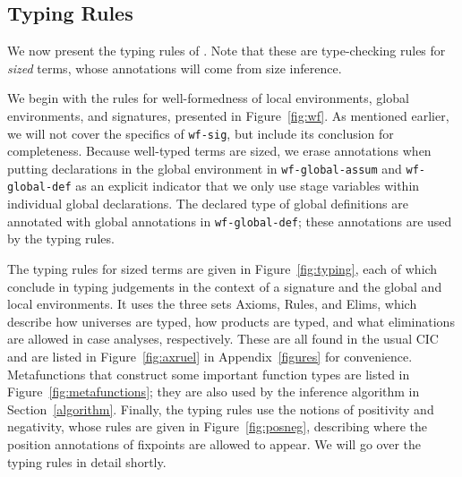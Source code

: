 \documentclass[sigplan,10pt,anonymous,review,nonacm]{acmart}
\begin{document}
\subsection{Typing Rules}





We now present the typing rules of \lang. Note that these are type-checking rules for \textit{sized} terms, whose annotations will come from size inference.

We begin with the rules for well-formedness of local environments, global environments, and signatures, presented in Figure~\ref{fig:wf}. As mentioned earlier, we will not cover the specifics of \texttt{wf-sig}, but include its conclusion for completeness. Because well-typed terms are sized, we erase annotations when putting declarations in the global environment in \texttt{wf-global-assum} and \texttt{wf-global-def} as an explicit indicator that we only use stage variables within individual global declarations. The declared type of global definitions are annotated with global annotations in \texttt{wf-global-def}; these annotations are used by the typing rules.





The typing rules for sized terms are given in Figure~\ref{fig:typing}, each of which conclude in typing judgements in the context of a signature and the global and local environments. It uses the three sets Axioms, Rules, and Elims, which describe how universes are typed, how products are typed, and what eliminations are allowed in case analyses, respectively. These are all found in the usual CIC and are listed in Figure~\ref{fig:axruel} in Appendix~\ref{figures} for convenience. Metafunctions that construct some important function types are listed in Figure~\ref{fig:metafunctions}; they are also used by the inference algorithm in Section~\ref{algorithm}. Finally, the typing rules use the notions of positivity and negativity, whose rules are given in Figure~\ref{fig:posneg}, describing where the position annotations of fixpoints are allowed to appear. We will go over the typing rules in detail shortly.
\end{document}
